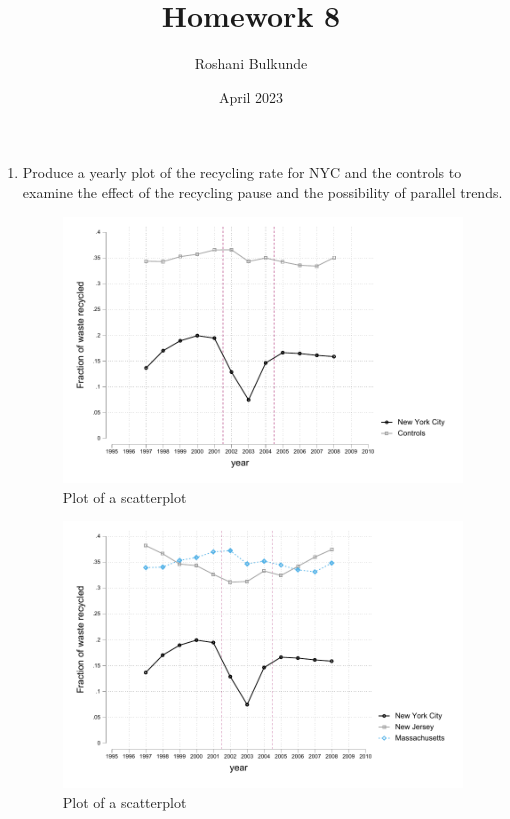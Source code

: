 \documentclass{article}
\title{Homework 8}
\author{Roshani Bulkunde}
\date{April 2023}
\begin{document}
\maketitle
\begin{enumerate}
    \item Produce a yearly plot of the recycling rate for NYC and the controls to examine the effect of the recycling pause and the possibility of parallel trends.
    
    
    \begin{figure}[ht]
    \centering
    \includegraphics[scale = 0.7]{hw8_q1parallel.pdf}
    \caption{Plot of a scatterplot}
    \label{fig:hw8_q1parallel}
    \end{figure}

    \begin{figure}[ht]
    \centering
    \includegraphics[scale = 0.7]{hw8_q1parallel_2.pdf}
    \caption{Plot of a scatterplot}
    \label{fig:hw8_q1parallel_2}
    \end{figure}


\end{enumerate}
\end{document}
